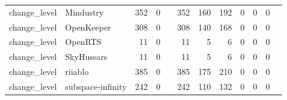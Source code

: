 \begin{table}[htbp]
{\begin{tabular}{llrrrrrrrrrr}
change\_level & Mindustry & 352 & 0 &  & 352 & 160 & 192 & 0 & 0 & 0 &  \\
change\_level & OpenKeeper & 308 & 0 &  & 308 & 140 & 168 & 0 & 0 & 0 &  \\
change\_level & OpenRTS & 11 & 0 &  & 11 & 5 & 6 & 0 & 0 & 0 &  \\
change\_level & SkyHussars & 11 & 0 &  & 11 & 5 & 6 & 0 & 0 & 0 &  \\
change\_level & riiablo & 385 & 0 &  & 385 & 175 & 210 & 0 & 0 & 0 &  \\
change\_level & subspace-infinity & 242 & 0 &  & 242 & 110 & 132 & 0 & 0 & 0 &  \\
\bottomrule
\end{tabular}}
\end{table}
